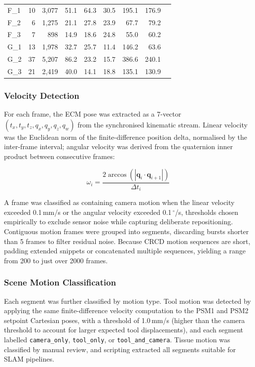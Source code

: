 \documentclass{article}
\begin{document}
\begin{table}[!ht]
{\begin{tabular}{lrrrrrrrc}
\midrule
F\_1 & 10 &  3{,}077 &  51.1 &  64.3 &  30.5 &  195.1 &  176.9 & \\
F\_2 &  6 &  1{,}275 &  21.1 &  27.8 &  23.9 &   67.7 &   79.2 & \\
F\_3 &  7 &    898 &  14.9 &  18.6 &  24.8 &   55.0 &   60.2 & \\
\midrule
G\_1 & 13 &  1{,}978 &  32.7 &  25.7 &  11.4 &  146.2 &   63.6 & \\
G\_2 & 37 &  5{,}207 &  86.2 &  23.2 &  15.7 &  386.6 &  240.1 & \\
G\_3 & 21 &  2{,}419 &  40.0 &  14.1 &  18.8 &  135.1 &  130.9 & \\
\bottomrule
\end{tabular}%
}
\end{table}
\FloatBarrier
\subsubsection{Velocity Detection}
\label{sec:motion_analysis}
For each frame, the ECM pose was extracted as a 7-vector $(t_x, t_y, t_z, q_x, q_y, q_z, q_w)$ from the synchronised kinematic stream. Linear velocity was the Euclidean norm of the finite-difference position delta, normalised by the inter-frame interval; angular velocity was derived from the quaternion inner product between consecutive frames:

\begin{equation}
    \omega_i = \frac{2\arccos\left(|\mathbf{q}_i \cdot \mathbf{q}_{i+1}|\right)}{\Delta t_i}
\end{equation}

A frame was classified as containing camera motion when the linear velocity exceeded 0.1\,mm/s or the angular velocity exceeded 0.1\,$^\circ$/s, thresholds chosen empirically to exclude sensor noise while capturing deliberate repositioning. Contiguous motion frames were grouped into segments, discarding bursts shorter than 5 frames to filter residual noise. Because CRCD motion sequences are short, padding extended snippets or concatenated multiple sequences, yielding a range from 200 to just over 2000 frames.

\subsubsection{Scene Motion Classification}
Each segment was further classified by motion type. Tool motion was detected by applying the same finite-difference velocity computation to the PSM1 and PSM2 setpoint Cartesian poses, with a threshold of 1.0\,mm/s (higher than the camera threshold to account for larger expected tool displacements), and each segment labelled \texttt{camera\_only}, \texttt{tool\_only}, or \texttt{tool\_and\_camera}. Tissue motion was classified by manual review, and scripting extracted all segments suitable for SLAM pipelines.
\end{document}

